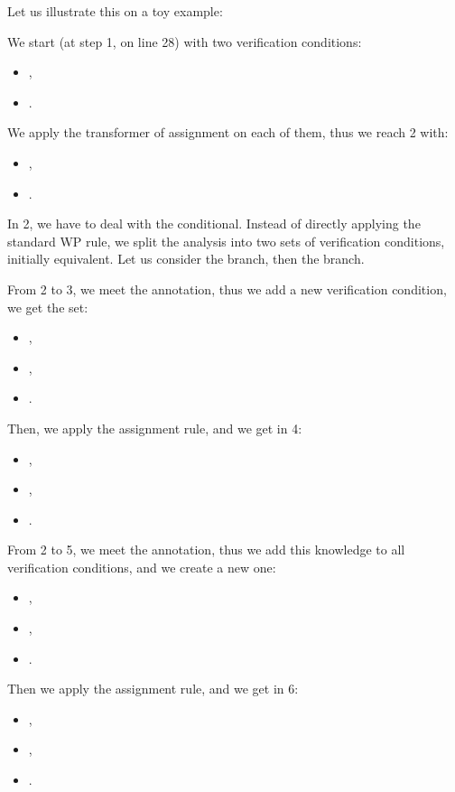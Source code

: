 Let us illustrate this on a toy example:




We start (at step 1, on line 28) with two verification conditions:
\begin{itemize}
  \item {},
  \item {}.
\end{itemize}
We apply the transformer of assignment on each of them, thus we reach 2 with:
\begin{itemize}
  \item {},
  \item {}.
\end{itemize}
In 2, we have to deal with the conditional. Instead of directly applying the
standard WP rule, we split the analysis into two sets of verification conditions,
initially equivalent. Let us consider the  branch, then the
 branch.


From 2 to 3, we meet the  annotation, thus we add a new
verification condition, we get the set:
\begin{itemize}
  \item {},
  \item {},
  \item {}.
\end{itemize}
Then, we apply the assignment rule, and we get in 4:
\begin{itemize}
  \item {},
  \item {},
  \item {}.
\end{itemize}


From 2 to 5, we meet the  annotation, thus we add this
knowledge to all verification conditions, and we create a new one:
\begin{itemize}
  \item {},
  \item {},
  \item {}.
\end{itemize}
Then we apply the assignment rule, and we get in 6:
\begin{itemize}
  \item {},
  \item {},
  \item {}.
\end{itemize}


